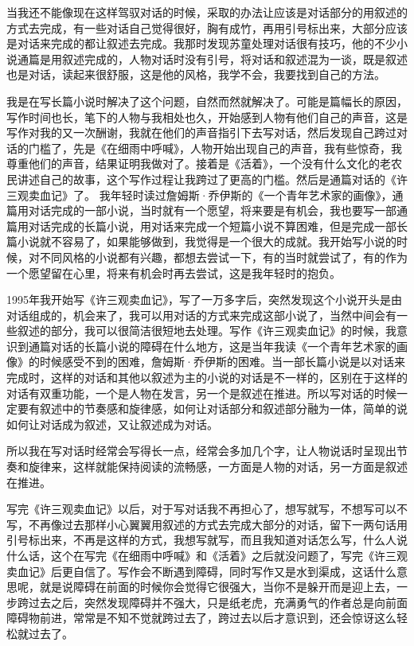 \documentclass[fontset=fandol,12pt,a5paper]{ctexbook}
\begin{document}
当我还不能像现在这样驾驭对话的时候，采取的办法让应该是对话部分的用叙述的方式去完成，有一些对话自己觉得很好，胸有成竹，再用引号标出来，大部分应该是对话来完成的都让叙述去完成。我那时发现苏童处理对话很有技巧，他的不少小说通篇是用叙述完成的，人物对话时没有引号，将对话和叙述混为一谈，既是叙述也是对话，读起来很舒服，这是他的风格，我学不会，我要找到自己的方法。

我是在写长篇小说时解决了这个问题，自然而然就解决了。可能是篇幅长的原因，写作时间也长，笔下的人物与我相处也久，开始感到人物有他们自己的声音，这是写作对我的又一次酬谢，我就在他们的声音指引下去写对话，然后发现自己跨过对话的门槛了，先是《在细雨中呼喊》，人物开始出现自己的声音，我有些惊奇，我尊重他们的声音，结果证明我做对了。接着是《活着》，一个没有什么文化的老农民讲述自己的故事，这个写作过程让我跨过了更高的门槛。然后是通篇对话的《许三观卖血记》了。
我年轻时读过詹姆斯·乔伊斯的《一个青年艺术家的画像》，通篇用对话完成的一部小说，当时就有一个愿望，将来要是有机会，我也要写一部通篇用对话完成的长篇小说，用对话来完成一个短篇小说不算困难，但是完成一部长篇小说就不容易了，如果能够做到，我觉得是一个很大的成就。我开始写小说的时候，对不同风格的小说都有兴趣，都想去尝试一下，有的当时就尝试了，有的作为一个愿望留在心里，将来有机会时再去尝试，这是我年轻时的抱负。

1995年我开始写《许三观卖血记》，写了一万多字后，突然发现这个小说开头是由对话组成的，机会来了，我可以用对话的方式来完成这部小说了，当然中间会有一些叙述的部分，我可以很简洁很短地去处理。写作《许三观卖血记》的时候，我意识到通篇对话的长篇小说的障碍在什么地方，这是当年我读《一个青年艺术家的画像》的时候感受不到的困难，詹姆斯·乔伊斯的困难。当一部长篇小说是以对话来完成时，这样的对话和其他以叙述为主的小说的对话是不一样的，区别在于这样的对话有双重功能，一个是人物在发言，另一个是叙述在推进。所以写对话的时候一定要有叙述中的节奏感和旋律感，如何让对话部分和叙述部分融为一体，简单的说如何让对话成为叙述，又让叙述成为对话。

所以我在写对话时经常会写得长一点，经常会多加几个字，让人物说话时呈现出节奏和旋律来，这样就能保持阅读的流畅感，一方面是人物的对话，另一方面是叙述在推进。

写完《许三观卖血记》以后，对于写对话我不再担心了，想写就写，不想写可以不写，不再像过去那样小心翼翼用叙述的方式去完成大部分的对话，留下一两句话用引号标出来，不再是这样的方式，我想写就写，而且我知道对话怎么写，什么人说什么话，这个在写完《在细雨中呼喊》和《活着》之后就没问题了，写完《许三观卖血记》后更自信了。写作会不断遇到障碍，同时写作又是水到渠成，这话什么意思呢，就是说障碍在前面的时候你会觉得它很强大，当你不是躲开而是迎上去，一步跨过去之后，突然发现障碍并不强大，只是纸老虎，充满勇气的作者总是向前面障碍物前进，常常是不知不觉就跨过去了，跨过去以后才意识到，还会惊讶这么轻松就过去了。
\end{document}
